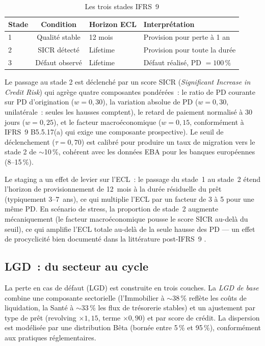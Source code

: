 \documentclass[10pt, a4paper, oneside]{report}
\theoremstyle{definition}
\begin{document}
\begin{table}[htbp]
\centering
\caption{Les trois stades IFRS~9}
\label{tab:stages}
\begin{tabular}{lcll}
\toprule
Stade & Condition & Horizon ECL & Interprétation \\
\midrule
1 & Qualité stable & 12 mois & Provision pour perte à 1 an \\
2 & SICR détecté & Lifetime & Provision pour toute la durée \\
3 & Défaut observé & Lifetime & Défaut réalisé, PD $= 100\,\%$ \\
\bottomrule
\end{tabular}
\end{table}

Le passage au stade 2 est déclenché par un score SICR (\emph{Significant Increase in Credit Risk}) qui agrège quatre composantes pondérées~: le ratio de PD courante sur PD d'origination ($w = 0{,}30$), la variation absolue de PD ($w = 0{,}30$, unilatérale~: seules les hausses comptent), le retard de paiement normalisé à 30 jours ($w = 0{,}25$), et le facteur macroéconomique ($w = 0{,}15$, conformément à IFRS~9 B5.5.17(a) qui exige une composante prospective). Le seuil de déclenchement ($\tau = 0{,}70$) est calibré pour produire un taux de migration vers le stade 2 de $\sim$10\,\%, cohérent avec les données EBA pour les banques européennes (8--15\,\%).

Le staging a un effet de levier sur l'ECL~: le passage du stade~1 au stade~2 étend l'horizon de provisionnement de 12~mois à la durée résiduelle du prêt (typiquement 3--7~ans), ce qui multiplie l'ECL par un facteur de 3 à 5 pour une même PD. En scénario de stress, la proportion de stade~2 augmente mécaniquement (le facteur macroéconomique pousse le score SICR au-delà du seuil), ce qui amplifie l'ECL totale au-delà de la seule hausse des PD --- un effet de procyclicité bien documenté dans la littérature post-IFRS~9 \citep{eba_st_2023}.

\subsection{LGD~: du secteur au cycle}

La perte en cas de défaut (LGD) est construite en trois couches. La \emph{LGD de base} combine une composante sectorielle (l'Immobilier à $\sim$38\,\% reflète les coûts de liquidation, la Santé à $\sim$33\,\% les flux de trésorerie stables) et un ajustement par type de prêt (revolving $\times 1{,}15$, terme $\times 0{,}90$) et par score de crédit. La dispersion est modélisée par une distribution Bêta (bornée entre 5\,\% et 95\,\%), conformément aux pratiques réglementaires.
\end{document}
